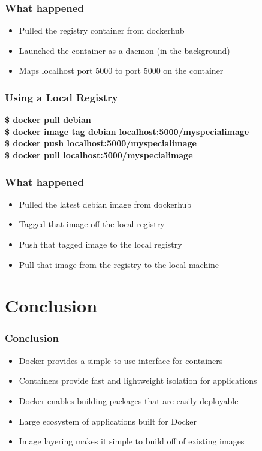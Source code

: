 \documentclass[aspectratio=169,11pt,hyperref={colorlinks=true}]{beamer}
\begin{document}
\begin{frame}
    \frametitle{What happened}
    \begin{itemize}
        \item Pulled the registry container from dockerhub
        \item Launched the container as a daemon (in the background)
        \item Maps localhost port 5000 to port 5000 on the container
    \end{itemize}
\end{frame}

\begin{frame}
    \frametitle{Using a Local Registry}
    \textbf{\$ docker pull debian} \\
    \textbf{\$ docker image tag debian localhost:5000/myspecialimage} \\
    \textbf{\$ docker push localhost:5000/myspecialimage} \\
    \textbf{\$ docker pull localhost:5000/myspecialimage}
\end{frame}

\begin{frame}
    \frametitle{What happened}
    \begin{itemize}
        \item Pulled the latest debian image from dockerhub
        \item Tagged that image off the local registry
        \item Push that tagged image to the local registry
        \item Pull that image from the registry to the local machine
    \end{itemize}
\end{frame}

\section{Conclusion}
\begin{frame}
    \frametitle{Conclusion}
    \begin{itemize}
        \item Docker provides a simple to use interface for containers
        \item Containers provide fast and lightweight isolation for applications
        \item Docker enables building packages that are easily deployable
        \item Large ecosystem of applications built for Docker
        \item Image layering makes it simple to build off of existing images
    \end{itemize}
\end{frame}
\end{document}
